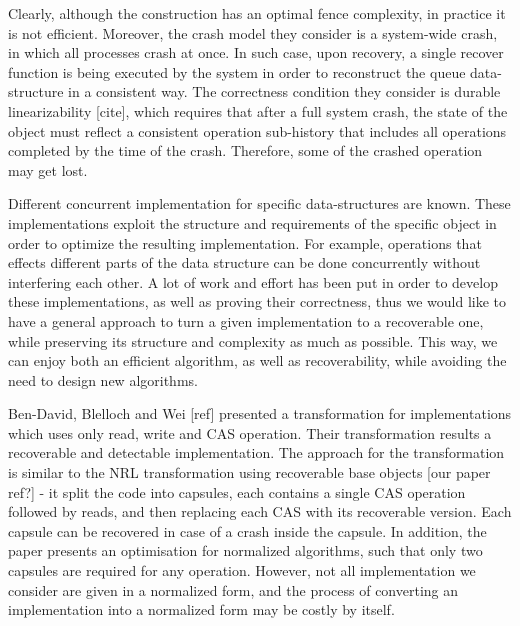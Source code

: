 Clearly, although the construction has an optimal fence complexity, in practice it is not efficient. Moreover, the crash model they consider is a system-wide crash, in which all processes crash at once. In such case, upon recovery, a single recover function is being executed by the system in order to reconstruct the queue data-structure in a consistent way. The correctness condition they consider is durable linearizability [cite], which requires that after a full system crash, the state of the object must reﬂect a consistent operation sub-history that includes all operations completed by the time of the crash. Therefore, some of the crashed operation may get lost.

Different concurrent implementation for specific data-structures are known. These implementations exploit the structure and requirements of the specific object in order to optimize the resulting implementation. For example, operations that effects different parts of the data structure can be done concurrently without interfering each other. A lot of work and effort has been put in order to develop these implementations, as well as proving their correctness, thus we would like to have a general approach to turn a given implementation to a recoverable one, while preserving its structure and complexity as much as possible. This way, we can enjoy both an efficient algorithm, as well as recoverability, while avoiding the need to design new algorithms.

Ben-David, Blelloch and Wei [ref] presented a transformation for implementations which uses only read, write and CAS operation. Their transformation results a recoverable and detectable implementation. The approach for the transformation is similar to the NRL transformation using recoverable base objects [our paper ref?] - it split the code into capsules, each contains a single CAS operation followed by reads, and then replacing each CAS with its recoverable version. Each capsule can be recovered in case of a crash inside the capsule. In addition, the paper presents an optimisation for normalized algorithms, such that only two capsules are required for any operation. However, not all implementation we consider are given in a normalized form, and the process of converting an implementation into a normalized form may be costly by itself.


